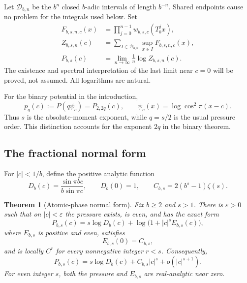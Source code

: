 \documentclass[11pt,a4paper]{article}
\numberwithin{equation}{section}
\newtheorem{theorem}{Theorem}[section]
\theoremstyle{definition}
\theoremstyle{remark}
\begin{document}
Let $\mathcal D_{b,n}$ be the $b^n$ closed $b$-adic intervals of length
$b^{-n}$. Shared endpoints cause no problem for the integrals used below.
Set
\begin{align}
 F_{b,s,n,c}(x)&=\prod_{j=0}^{n-1}w_{b,s,c}(T_b^jx),\\
 Z_{b,s,n}(c)&=\sum_{I\in\mathcal D_{b,n}}\sup_{x\in I}F_{b,s,n,c}(x),\\
 P_{b,s}(c)&=\lim_{n\to\infty}\frac1n\log Z_{b,s,n}(c).
 \label{eq:pressure}
\end{align}
The existence and spectral interpretation of the last limit near $c=0$
will be proved, not assumed. All logarithms are natural.

For the binary potential in the introduction,
\begin{equation}
 p_q(c):=P(q\psi_c)=P_{2,2q}(c),\qquad
 \psi_c(x)=\log\cos^2\pi(x-c).
 \label{eq:binary-translation}
\end{equation}
Thus $s$ is the absolute-moment exponent, while $q=s/2$ is the usual
pressure order. This distinction accounts for the exponent $2q$ in the
binary theorem.

\subsection{The fractional normal form}
For $|c|<1/b$, define the positive analytic function
\begin{equation}
 D_b(c)=\frac{\sin\pi bc}{b\sin\pi c},\qquad D_b(0)=1,
 \qquad C_{b,s}=2(b^s-1)\zeta(s).
 \label{eq:constants}
\end{equation}

\begin{theorem}[Atomic-phase normal form]
\label{thm:normal}
Fix $b\ge2$ and $s>1$. There is $\varepsilon>0$ such that on
$|c|<\varepsilon$ the pressure exists, is even, and has the exact form
\begin{equation}
 P_{b,s}(c)=s\log D_b(c)+
 \log\bigl(1+|c|^s E_{b,s}(c)\bigr),
 \label{eq:normal}
\end{equation}
where $E_{b,s}$ is positive and even, satisfies
\begin{equation}
 E_{b,s}(0)=C_{b,s},
 \label{eq:Ezero}
\end{equation}
and is locally $C^r$ for every nonnegative integer $r<s$.
Consequently,
\begin{equation}
 P_{b,s}(c)=s\log D_b(c)+C_{b,s}|c|^s+o(|c|^{s+1}).
 \label{eq:asymp-strong}
\end{equation}
For even integer $s$, both the pressure and $E_{b,s}$ are real-analytic
near zero.
\end{theorem}
\end{document}
